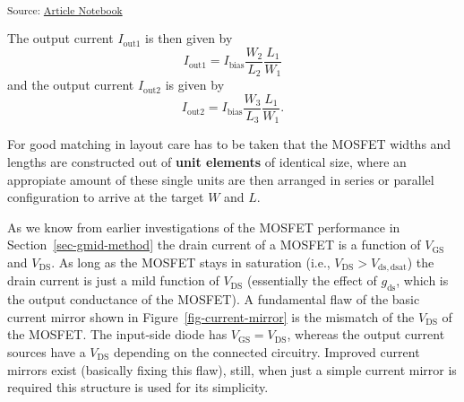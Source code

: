 \documentclass[
  a4paper,
  DIV=11,
  numbers=noendperiod]{scrartcl}
\begin{document}
\textsubscript{Source:
\href{https://iic-jku.github.io/analog-circuit-design/index.qmd.html}{Article
Notebook}}

The output current \(I_\mathrm{out1}\) is then given by \[
I_\mathrm{out1} = I_\mathrm{bias} \frac{W_2}{L_2} \frac{L_1}{W_1}
\] and the output current \(I_\mathrm{out2}\) is given by \[
I_\mathrm{out2} = I_\mathrm{bias} \frac{W_3}{L_3} \frac{L_1}{W_1}.
\]

For good matching in layout care has to be taken that the MOSFET widths
and lengths are constructed out of \textbf{unit elements} of identical
size, where an appropiate amount of these single units are then arranged
in series or parallel configuration to arrive at the target \(W\) and
\(L\).

As we know from earlier investigations of the MOSFET performance in
Section~\ref{sec-gmid-method} the drain current of a MOSFET is a
function of \(V_\mathrm{GS}\) and \(V_\mathrm{DS}\). As long as the
MOSFET stays in saturation (i.e., \(V_\mathrm{DS}> V_\mathrm{ds,dsat}\))
the drain current is just a mild function of \(V_\mathrm{DS}\)
(essentially the effect of \(g_\mathrm{ds}\), which is the output
conductance of the MOSFET). A fundamental flaw of the basic current
mirror shown in Figure~\ref{fig-current-mirror} is the mismatch of the
\(V_\mathrm{DS}\) of the MOSFET. The input-side diode has
\(V_\mathrm{GS}= V_\mathrm{DS}\), whereas the output current sources
have a \(V_\mathrm{DS}\) depending on the connected circuitry. Improved
current mirrors exist (basically fixing this flaw), still, when just a
simple current mirror is required this structure is used for its
simplicity.
\end{document}
